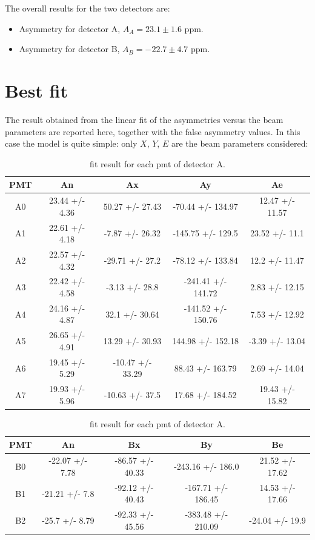 The overall results for the two detectors are: 
\begin{itemize}
\item Asymmetry for detector A, $A_{A} =  23.1 \pm 1.6$ ppm.
\item Asymmetry for detector B, $A_{B} = -22.7 \pm 4.7$ ppm.
\end{itemize}


\section{Best fit}
The result obtained from the linear fit of the asymmetries versus the beam parameters are reported here, together with the false asymmetry values. In this case the model is quite simple: only $X$, $Y$, $E$ are the beam parameters considered:

\begin{table}[h] \label{Tab:FitResult}
\centering
\begin{tabular}{|c|c|c|c|c|}
\hline
 PMT   & An             & Ax              & Ay                 & Ae              \\
\hline
 A0    & 23.44 +/- 4.36 	& 50.27 +/- 27.43  & -70.44 +/- 134.97  & 12.47 +/- 11.57 \\
 A1    & 22.61 +/- 4.18     & -7.87 +/- 26.32  & -145.75 +/- 129.5  & 23.52 +/- 11.1  \\
 A2    & 22.57 +/- 4.32     & -29.71 +/- 27.2  & -78.12 +/- 133.84  & 12.2 +/- 11.47  \\
 A3    & 22.42 +/- 4.58 	& -3.13 +/- 28.8   & -241.41 +/- 141.72 & 2.83 +/- 12.15  \\
 A4    & 24.16 +/- 4.87     & 32.1 +/- 30.64   & -141.52 +/- 150.76 & 7.53 +/- 12.92  \\
 A5    & 26.65 +/- 4.91     & 13.29 +/- 30.93  & 144.98 +/- 152.18  & -3.39 +/- 13.04 \\
 A6    & 19.45 +/- 5.29     & -10.47 +/- 33.29 & 88.43 +/- 163.79   & 2.69 +/- 14.04  \\
 A7    & 19.93 +/- 5.96     & -10.63 +/- 37.5  & 17.68 +/- 184.52   & 19.43 +/- 15.82 \\
\hline
\end{tabular}
\caption{fit result for each pmt of detector A.}
\end{table}

\begin{table}[h]
\centering
\begin{tabular}{|c|c|c|c|c|}
\hline
 PMT   & An             & Bx              & By                 & Be              \\
\hline
 B0    & -22.07 +/- 7.78 & -86.57 +/- 40.33 & -243.16 +/- 186.0  & 21.52 +/- 17.62 \\
 B1    & -21.21 +/- 7.8  & -92.12 +/- 40.43 & -167.71 +/- 186.45 & 14.53 +/- 17.66 \\
 B2    & -25.7 +/- 8.79  & -92.33 +/- 45.56 & -383.48 +/- 210.09 & -24.04 +/- 19.9 \\
\hline
\end{tabular}
\caption{fit result for each pmt of detector A.}
\end{table}


